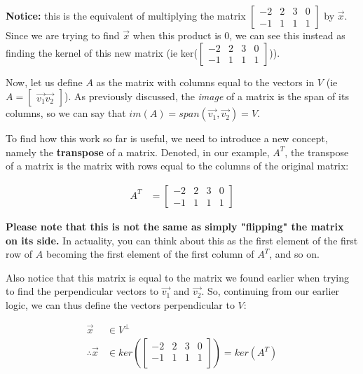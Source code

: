 \documentclass[12pt]{article}
\begin{document}
\textbf{Notice:} this is the equivalent of multiplying the matrix $\begin{bmatrix}
    -2 & 2 & 3 & 0\\
    -1 & 1 & 1 & 1
\end{bmatrix}$ by $\vec{x}$. Since we are trying to find $\vec{x}$ when this product is $0$, we can see this instead as finding the kernel of this new matrix (ie ker($\begin{bmatrix}
    -2 & 2 & 3 & 0\\
    -1 & 1 & 1 & 1\end{bmatrix}$)).

Now, let us define $A$ as the matrix with columns equal to the vectors in $V$ (ie $A = \begin{bmatrix}\vec{v_1} \vec{v_2}\end{bmatrix}$). As previously discussed, the \textit{image} of a matrix is the span of its columns, so we can say that $im(A) = span(\vec{v_1}, \vec{v_2}) = V$.

To find how this work so far is useful, we need to introduce a new concept, namely the \textbf{transpose} of a matrix. Denoted, in our example, $A^T$, the transpose of a matrix is the matrix with rows equal to the columns of the original matrix:

\begin{equation}
    \begin{split}
        A^T &= \begin{bmatrix}
            -2&2&3&0\\
            -1&1&1&1
        \end{bmatrix}
    \end{split}
\end{equation}
    
\textbf{Please note that this is not the same as simply "flipping" the matrix on its side.} In actuality, you can think about this as the first element of the first row of $A$ becoming the first element of the first column of $A^T$, and so on.

Also notice that this matrix is equal to the matrix we found earlier when trying to find the perpendicular vectors to $\vec{v_1}$ and $\vec{v_2}$. So, continuing from our earlier logic, we can thus define the vectors perpendicular to $V$:

\begin{equation}
    \begin{split}
        \vec{x} &\in V^\bot\\
        \therefore \vec{x} &\in ker(\begin{bmatrix}
            -2 & 2 & 3 & 0\\
            -1 & 1 & 1 & 1\\
        \end{bmatrix}) = ker(A^T)\\
    \end{split}
\end{equation}
\end{document}
